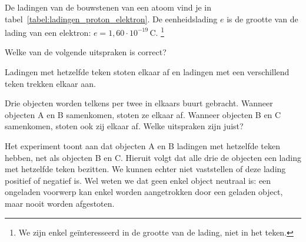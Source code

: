 \documentclass{ximera}
\begin{document}
De ladingen van de bouwstenen van een atoom vind je in tabel~\ref{tabel:ladingen_proton_elektron}. De eenheidslading $e$ is de grootte van de lading van een elektron: $e=1{,}60\cdot 10^{-19}\,\mathrm{C}$. \footnote{We zijn enkel geïnteresseerd in de grootte van de lading, niet in het teken.}



\begin{question}
	Welke van de volgende uitspraken is correct?
	
	\begin{multipleChoice}
	\end{multipleChoice}

	\begin{solution}
	Ladingen met hetzelfde teken stoten elkaar af en ladingen met een verschillend teken trekken elkaar aan.
	\end{solution}
\end{question}
\begin{question}
	Drie objecten worden telkens per twee in elkaars buurt gebracht. Wanneer objecten A en B samenkomen, stoten ze elkaar af. Wanneer objecten B en C samenkomen, stoten ook zij elkaar af. Welke uitspraken zijn juist?

	\begin{selectAll}
	\end{selectAll}
	\begin{solution}
		Het experiment toont aan dat objecten A en B ladingen met hetzelfde teken hebben, net als objecten B en C. Hieruit volgt dat alle drie de objecten een lading met hetzelfde teken bezitten. We kunnen echter niet vaststellen of deze lading positief of negatief is. Wel weten we dat geen enkel object neutraal is: een ongeladen voorwerp kan enkel worden aangetrokken door een geladen object, maar nooit worden afgestoten.
	\end{solution}
\end{question}
\end{document}
